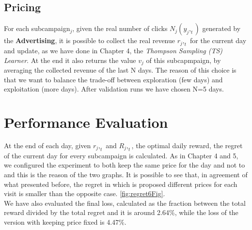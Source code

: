 \subsection{Pricing}
For each subcampaign$_j$, given the real number of clicks $ N_j(y_j,_t) $ generated by the \textbf{Advertising}, it is possible to collect the real revenue $ r_j,_t $ for the current day and update, as we have done in Chapter 4, the \textit{Thompson Sampling (TS) Learner}. At the end it also returns the value $ v_j $ of this subcapmpaign, by averaging the collected revenue of the last N days. The reason of this choice is that we want to balance the trade-off between exploration (few days) and exploitation (more days). After validation runs we have chosen N=5 days.


\section{Performance Evaluation}
At the end of each day, given $ r_j,_t $ and $ R_j,_t $, the optimal daily reward, the regret of the current day for every subcampaign is calculated. As in Chapter 4 and 5, we configured the experiment to both keep the same price for the day and not to and this is the reason of the two graphs. It is possible to see that, in agreement of what presented before, the regret in which is proposed different prices for each visit is smaller than the opposite case. \ref{fig:regret6Fig}.\\
We have also evaluated the final loss, calculated as the fraction between the total reward divided by the total regret and it is around 2.64\%, while the loss of the version with keeping price fixed is 4.47\%. \\

